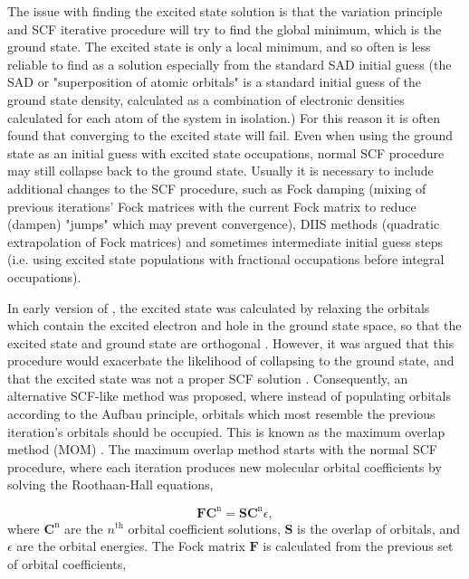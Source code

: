 The issue with finding the excited state solution is that the variation principle
and SCF iterative procedure will try to find the global minimum, which is the 
ground state. The excited state is only a local minimum, and so often is less reliable
to find as a solution especially from the standard SAD initial guess \cite{Almlof1982} 
(the SAD or "superposition of atomic orbitals" is a standard initial guess of the
ground state density, calculated as a combination of electronic densities calculated
for each atom of the system in isolation.) For this reason it is often found that 
converging to the \dscf excited state will fail. Even when using the ground state 
as an initial guess with excited state occupations, normal SCF procedure may still 
collapse back to the ground state. Usually it is necessary to include additional 
changes to the SCF procedure, such as Fock damping (mixing of previous iterations'
Fock matrices with the current Fock matrix to reduce (dampen) "jumps" which may
prevent convergence), DIIS methods (quadratic extrapolation of Fock matrices) and
sometimes intermediate initial guess steps (i.e. using excited state populations 
with fractional occupations before integral occupations).

In early version of \dscf, the excited state was calculated by relaxing the orbitals
which contain the excited electron and hole in the ground state space, so that the
excited state and ground state are orthogonal \cite{Hunt1969}. However, it was
argued that this procedure would exacerbate the likelihood of collapsing to the ground
state, and that the excited state was not a proper SCF solution \cite{Gilbert2008}.
Consequently, an alternative SCF-like method was proposed, where instead of populating orbitals 
according to the Aufbau principle, orbitals which most resemble the previous iteration's
orbitals should be occupied. This is known as the maximum overlap method (MOM) \cite{Gilbert2008}. 
The maximum overlap method starts with the normal SCF procedure, where each iteration
produces new molecular orbital coefficients by solving the Roothaan-Hall equations, \cite{Roothaan1951}

\begin{equation}
\mathbf{F} \mathbf{C}^{\text{n}} = \mathbf{S} \mathbf{C}^{\text{n}} \epsilon,
\label{eq:roothaan_hall}
\end{equation}
%
where $\mathbf{C}^{\text{n}}$ are the $n^{\text{th}}$ orbital coefficient solutions, 
$\mathbf{S}$ is the overlap of orbitals, and $\epsilon$ are the orbital energies. 
The Fock matrix $\mathbf{F}$ is calculated from the previous set of orbital coefficients,


